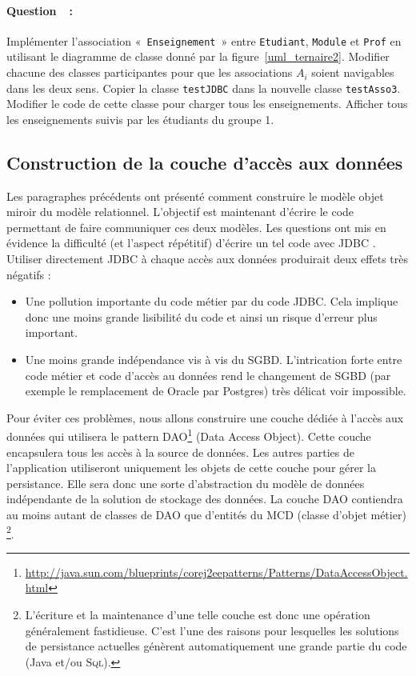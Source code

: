 \documentclass[a4paper,11pt]{article}
\newcounter{compteurQuestion}
\newcommand{\Question}{\paragraph*{Question~\thecompteurQuestion~:}\addtocounter{compteurQuestion}{1}}
\begin{document}
\Question Implémenter l'association «~\texttt{Enseignement}~» entre \texttt{Etudiant}, \texttt{Module} et \texttt{Prof} 
en utilisant le diagramme de classe donné par la figure~\ref{uml_ternaire2}. 
Modifier chacune des classes participantes pour que les associations $A_i$ soient navigables dans les deux sens. 
Copier la classe \texttt{testJDBC} dans la nouvelle classe \texttt{testAsso3}.
Modifier le code de cette classe pour charger tous les enseignements. 
Afficher tous les enseignements suivis par les étudiants du groupe 1.

\subsection{Construction de la couche d'accès aux données}
Les paragraphes précédents ont présenté comment construire le modèle objet miroir du modèle relationnel.
L'objectif est maintenant d'écrire le code permettant de faire communiquer ces deux modèles.
Les questions ont mis en évidence la difficulté (et l'aspect répétitif) d'écrire un tel code avec JDBC . 
Utiliser directement JDBC à chaque accès aux données produirait deux effets très négatifs : 
\begin{itemize}
 	\item Une pollution importante du code métier par du code JDBC. Cela implique donc une moins 
 	grande lisibilité du code et ainsi un risque d'erreur plus important.
 	\item Une moins grande indépendance vis à vis du SGBD. L'intrication forte entre code métier et 
 	code d'accès au données rend le changement de SGBD (par exemple le remplacement de Oracle par Postgres) 
 	très délicat voir impossible.
\end{itemize} 
Pour éviter ces problèmes, nous allons construire une couche dédiée à l'accès aux données 
qui utilisera le pattern DAO\footnote{\url{http://java.sun.com/blueprints/corej2eepatterns/Patterns/DataAccessObject.html}} (Data Access Object).
Cette couche encapsulera tous les accès à la source de données. Les autres parties de l'application 
utiliseront uniquement les objets de cette couche pour gérer la persistance. Elle 
sera donc une sorte d'abstraction du modèle de données indépendante de la solution de stockage 
des données. La couche DAO contiendra au moins autant de classes de DAO que d'entités du MCD (classe d'objet métier) 
\footnote{L'écriture et la maintenance d'une telle couche est donc une opération généralement fastidieuse. 
C'est l'une des raisons pour lesquelles les solutions de persistance actuelles génèrent 
automatiquement une grande partie du code (Java et/ou \textsc{Sql}).}.
\end{document}
